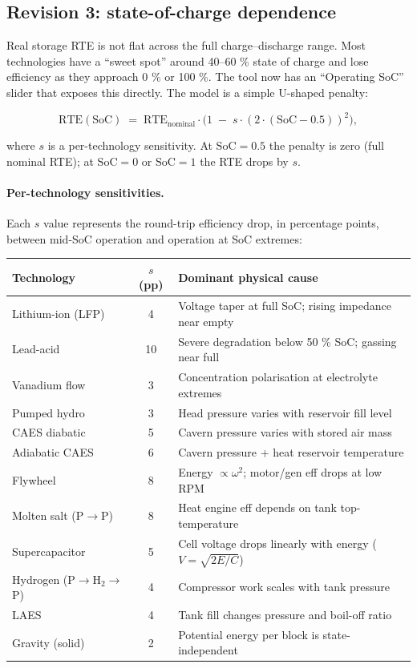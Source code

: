 \subsection*{Revision 3: state-of-charge dependence}

Real storage RTE is not flat across the full charge--discharge range.
Most technologies have a ``sweet spot'' around 40--60 \% state of
charge and lose efficiency as they approach 0 \% or 100 \%. The tool
now has an ``Operating SoC'' slider that exposes this directly. The
model is a simple U-shaped penalty:

\[
\mathrm{RTE}(\mathrm{SoC}) \;=\; \mathrm{RTE}_{\mathrm{nominal}}
\cdot \bigl(1 \;-\; s \cdot (2 \cdot (\mathrm{SoC} - 0.5))^2 \bigr),
\]

where $s$ is a per-technology sensitivity. At $\mathrm{SoC} = 0.5$
the penalty is zero (full nominal RTE); at $\mathrm{SoC} = 0$ or
$\mathrm{SoC} = 1$ the RTE drops by $s$.

\paragraph{Per-technology sensitivities.}
Each $s$ value represents the round-trip efficiency drop, in
percentage points, between mid-SoC operation and operation at SoC
extremes:

\begin{footnotesize}
\begin{tabular}{|l|c|l|}
\hline
\textbf{Technology}   & \textbf{$s$ (pp)} & \textbf{Dominant physical cause} \\
\hline
Lithium-ion (LFP)     &  4 & Voltage taper at full SoC; rising impedance near empty \\
Lead-acid             & 10 & Severe degradation below 50 \% SoC; gassing near full \\
Vanadium flow         &  3 & Concentration polarisation at electrolyte extremes \\
Pumped hydro          &  3 & Head pressure varies with reservoir fill level \\
CAES diabatic         &  5 & Cavern pressure varies with stored air mass \\
Adiabatic CAES        &  6 & Cavern pressure + heat reservoir temperature \\
Flywheel              &  8 & Energy $\propto \omega^2$; motor/gen eff drops at low RPM \\
Molten salt (P$\to$P) &  8 & Heat engine eff depends on tank top-temperature \\
Supercapacitor        &  5 & Cell voltage drops linearly with energy ($V = \sqrt{2E/C}$) \\
Hydrogen (P$\to$H$_2\to$P) & 4 & Compressor work scales with tank pressure \\
LAES                  &  4 & Tank fill changes pressure and boil-off ratio \\
Gravity (solid)       &  2 & Potential energy per block is state-independent \\
\hline
\end{tabular}
\end{footnotesize}

